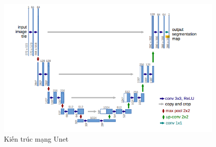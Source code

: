 \begin{figure}[h]
\centering
    \includegraphics[totalheight=9.5cm]{Images/unet.png}
    \caption{Kiến trúc mạng Unet}
    \label{unetPic}
\end{figure}



